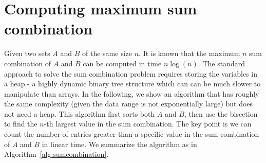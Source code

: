 \documentclass[onefignum, onetabnum]{siamart190516}
\newcommand{\<}{\langle}
\renewcommand{\>}{\rangle}
\begin{document}
\section{Computing maximum sum combination}\label{sec:maxsum}
Given two sets $A$ and $B$ of the same size $n$.
It is known that the maximum $n$ sum combination of $A$ and $B$ can be computed in time $n\log(n)$.
The standard approach to solve the sum combination problem requires storing the variables in a heap - a highly dynamic binary tree structure which can can be much slower to manipulate than arrays.
In the following, we show an algorithm that has roughly the same complexity (given the data range is not exponentially large)
but does not need a heap.
This algorithm first sorts both $A$ and $B$, then use the bisection to find the $n$-th largest value in the sum combination.
The key point is we can count the number of entries greater than a specific value
in the sum combination of $A$ and $B$ in linear time.
We summarize the algorithm as in Algorithm~\ref{alg:sumcombination}.
\end{document}
